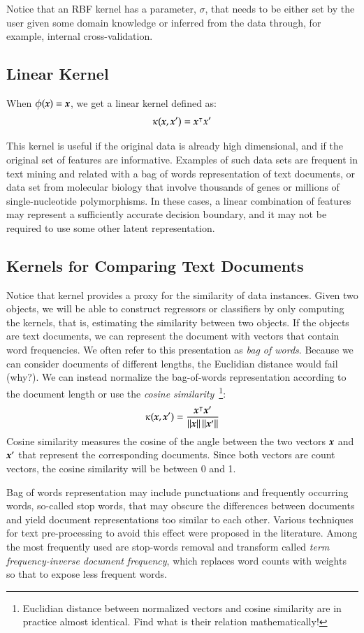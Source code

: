 \begin{refsection}
Notice that an RBF kernel has a parameter, $\sigma$, that needs to be either set by the user given some domain knowledge or inferred from the data through, for example, internal cross-validation.

\subsection*{Linear Kernel}

When $\phi(\boldsymbol{x})=\boldsymbol{x}$, we get a linear kernel defined as:
$$ \kappa(\boldsymbol{x},\boldsymbol{x}')=\boldsymbol{x}^\intercal x' $$

This kernel is useful if the original data is already high dimensional, and if the original set of features are informative. Examples of such data sets are frequent in text mining and related with a bag of words representation of text documents, or data set from molecular biology that involve thousands of genes or millions of single-nucleotide polymorphisms. In these cases, a linear combination of features may represent a sufficiently accurate decision boundary, and it may not be required to use some other latent representation.

\subsection*{Kernels for Comparing Text Documents}

Notice that kernel provides a proxy for the similarity of data instances. Given two objects, we will be able to construct regressors or classifiers by only computing the kernels, that is, estimating the similarity between two objects. If the objects are text documents, we can represent the document with vectors that contain word frequencies. We often refer to this presentation as {\em bag of words}. Because we can consider documents of different lengths, the Euclidian distance would fail (why?). We can instead normalize the bag-of-words representation according to the document length or use the {\em cosine similarity}~\footnote{Euclidian distance between normalized vectors and cosine similarity are in practice almost identical. Find what is their relation mathematically!}:
$$ \kappa(\boldsymbol{x}, \boldsymbol{x}')= {\boldsymbol{x}^\intercal \boldsymbol{x}'\over\left\lVert\boldsymbol{x}\right\rVert\left\lVert\boldsymbol{x}'\right\rVert}  $$
Cosine similarity measures the cosine of the angle between the two vectors $\boldsymbol{x}$ and $\boldsymbol{x}'$ that represent the corresponding documents. Since both vectors are count vectors, the cosine similarity will be between 0 and 1. 

Bag of words representation may include punctuations and frequently occurring words, so-called stop words, that may obscure the differences between documents and yield document representations too similar to each other. Various techniques for text pre-processing to avoid this effect were proposed in the literature. Among the most frequently used are stop-words removal and transform called {\em term frequency-inverse document frequency}, which replaces word counts with weights so that to expose less frequent words.


\end{refsection}
